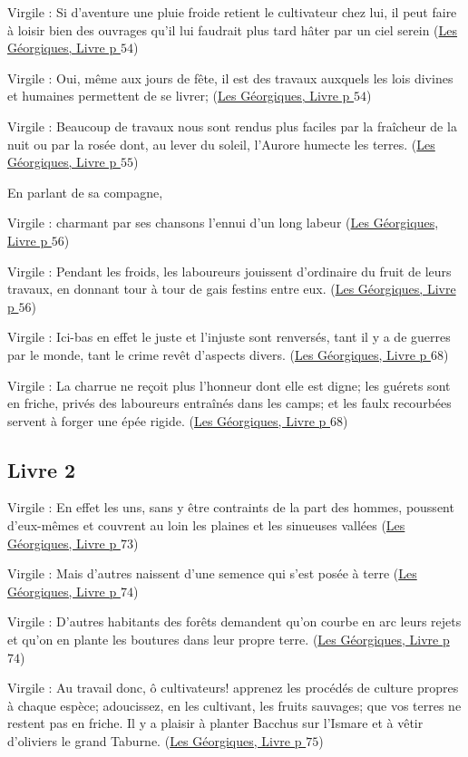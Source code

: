 \documentclass[a4paper, 11pt, hidelinks]{article}
\newcommand{\bs}{\bigskip}
\newcommand{\rb}[1]{\Romanbar{#1}}
\newcommand{\citer}[3]{\bs \begin{center} \textcolor{authorGray}{#1 :} \textcolor{citationRed}{\og #2 \fg} \textcolor{authorGray}{(\underline{#3})} \end{center} \bs}
\begin{document}
\citer{Virgile}{Si d'aventure une pluie froide retient le cultivateur chez lui, il peut faire à loisir bien des ouvrages qu'il lui 
faudrait plus tard hâter par un ciel serein}{Les Géorgiques, Livre \rb{1} p $54$}


\citer{Virgile}{Oui, même aux jours de fête, il est des travaux auxquels les lois divines et humaines permettent de se livrer;}{Les Géorgiques, Livre \rb{1} p $54$}


\citer{Virgile}{Beaucoup de travaux nous sont rendus plus faciles par la fraîcheur de la nuit ou par la rosée dont, au lever 
du soleil, l'Aurore humecte les terres.}{Les Géorgiques, Livre \rb{1} p $55$}


En parlant de sa compagne, \citer{Virgile}{charmant par ses chansons l'ennui d'un long labeur}{Les Géorgiques, Livre \rb{1} p $56$}


\citer{Virgile}{Pendant les froids, les laboureurs jouissent d'ordinaire du fruit de leurs travaux, en donnant tour à tour
de gais festins entre eux.}{Les Géorgiques, Livre \rb{1} p $56$}


\citer{Virgile}{Ici-bas en effet le juste et l'injuste sont renversés, tant il y a de guerres par le monde, tant le crime
revêt d'aspects divers.}{Les Géorgiques, Livre \rb{1} p $68$}


\citer{Virgile}{La charrue ne reçoit plus l'honneur dont elle est digne; les guérets sont en friche, privés des laboureurs
entraînés dans les camps; et les faulx recourbées servent à forger une épée rigide.}{Les Géorgiques, Livre \rb{1} p $68$}



\subsection{Livre 2}

\citer{Virgile}{En effet les uns, sans y être contraints de la part des hommes, poussent d'eux-mêmes et couvrent au loin 
les plaines et les sinueuses vallées}{Les Géorgiques, Livre \rb{2} p $73$}


\citer{Virgile}{Mais d'autres naissent d'une semence qui s'est posée à terre}{Les Géorgiques, Livre \rb{2} p $74$}


\citer{Virgile}{D'autres habitants des forêts demandent qu'on courbe en arc leurs rejets et qu'on en plante les 
boutures dans leur propre terre.}{Les Géorgiques, Livre \rb{2} p $74$}


\citer{Virgile}{Au travail donc, ô cultivateurs! apprenez les procédés de culture propres à chaque espèce; adoucissez, en les cultivant,
les fruits sauvages; que vos terres ne restent pas en friche. Il y a plaisir à planter Bacchus sur l'Ismare et à vêtir d'oliviers
le grand Taburne.}{Les Géorgiques, Livre \rb{2} p $75$}
\end{document}

